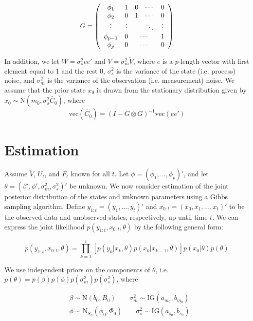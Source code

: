 \documentclass{article}
\begin{document}
\[G = \left(
\begin{array}{ccccc}
\phi_1 & 1 & 0 & \cdots & 0 \\
\phi_2 & 0 & 1 & \cdots & 0 \\
\vdots & \vdots & & \ddots & \vdots \\
\phi_{p-1} & 0 & \multicolumn{2}{c}{\cdots} & 1 \\
\phi_p & 0 & \multicolumn{2}{c}{\cdots} & 0
\end{array}
\right)\]

\noindent In addition, we let $W = \sigma^2_see'$ and $V = \sigma^2_m\tilde{V}$, where $e$ is a $p$-length vector with first element equal to 1 and the rest 0, $\sigma^2_s$ is the variance of the state (i.e. process) noise, and $\sigma^2_m$ is the variance of the observation (i.e. measurement) noise. We assume that the prior state $x_0$ is drawn from the stationary distribution given by $x_0 \sim \mbox{N}(m_0, \sigma^2_s\tilde{C_0})$, where \[\mbox{vec}({\tilde{C_0}}) = (I - G \otimes G)^{-1}\mbox{vec}(ee')\]

\section{Estimation}

Assume $\tilde{V}$, $U_t$, and $F_t$ known for all $t$. Let $\phi = (\phi_1,\ldots,\phi_p)'$, and let $\theta = (\beta', \phi', \sigma^2_m, \sigma^2_s)'$ be unknown. We now consider estimation of the joint posterior distribution of the states and unknown parameters using a Gibbs sampling algorithm. Define $y_{1:t} = (y_1,\ldots,y_t)'$ and $x_{0:t} = (x_0,x_1,\ldots,x_t)'$ to be the observed data and unobserved states, respectively, up until time $t$. We can express the joint likelihood $p(y_{1:t},x_{0:t},\theta)$ by the following general form:

\begin{equation}
p(y_{1:t},x_{0:t},\theta) = \prod_{k=1}^t\left[p(y_k|x_k,\theta)p(x_k|x_{k-1},\theta)\right]p(x_0|\theta)p(\theta) \label{eqn:lik}
\end{equation}

\noindent We use independent priors on the components of $\theta$, i.e. $p(\theta) = p(\beta)p(\phi)p(\sigma^2_m)p(\sigma^2_s)$, where

\begin{align*}
&\beta \sim \mbox{N}(b_0, B_0) \qquad \sigma^2_m \sim \mbox{IG}(a_{m_0}, b_{m_0})\\
&\phi \sim \mbox{N}_{S_\phi}(\phi_0, \Phi_0) \qquad \sigma^2_s \sim \mbox{IG}(a_{s_0}, b_{s_0})
\end{align*}
\end{document}
